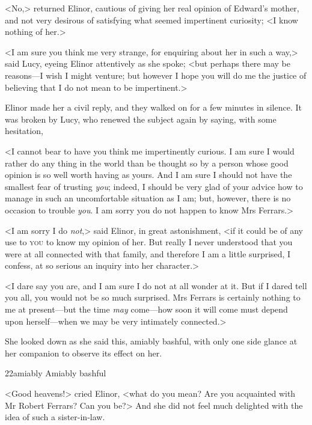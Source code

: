 <No,> returned Elinor, cautious of giving her real opinion of Edward's mother, and not very desirous of satisfying what seemed impertinent curiosity; <I know nothing of her.>

<I am sure you think me very strange, for enquiring about her in such a way,> said Lucy, eyeing Elinor attentively as she spoke; <but perhaps there may be reasons—I wish I might venture; but however I hope you will do me the justice of believing that I do not mean to be impertinent.>

Elinor made her a civil reply, and they walked on for a few minutes in silence. It was broken by Lucy, who renewed the subject again by saying, with some hesitation,

<I cannot bear to have you think me impertinently curious. I am sure I would rather do any thing in the world than be thought so by a person whose good opinion is so well worth having as yours. And I am sure I should not have the smallest fear of trusting \textit{you}; indeed, I should be very glad of your advice how to manage in such an uncomfortable situation as I am; but, however, there is no occasion to trouble \textit{you}. I am sorry you do not happen to know Mrs Ferrars.>

<I am sorry I do \textit{not},> said Elinor, in great astonishment, <if it could be of any use to \textsc{you} to know my opinion of her. But really I never understood that you were at all connected with that family, and therefore I am a little surprised, I confess, at so serious an inquiry into her character.>

<I dare say you are, and I am sure I do not at all wonder at it. But if I dared tell you all, you would not be so much surprised. Mrs Ferrars is certainly nothing to me at present—but the time \textit{may} come—how soon it will come must depend upon herself—when we may be very intimately connected.>

She looked down as she said this, amiably bashful, with only one side glance at her companion to observe its effect on her.


\begin{bwbigpic}
	[1.0]
	{22amiably} 
	{Amiably bashful} 
\end{bwbigpic}

<Good heavens!> cried Elinor, <what do you mean? Are you acquainted with Mr Robert Ferrars? Can you be?> And she did not feel much delighted with the idea of such a sister-in-law.

